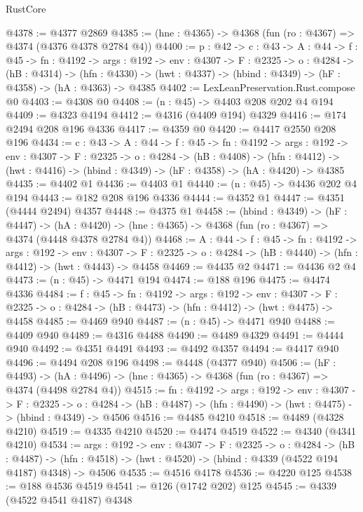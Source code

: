 \begin{lexlean}{RustCore}
\begin{coremodule}
@4378 := @4377 @2869
@4385 := (hne : @4365) -> @4368 (fun (ro : @4367) => @4374 (@4376 @4378 @2784 @4))
@4400 := {p : @42} ->
  {c : @43} ->
  {A : @44} ->
  {f : @45} ->
  {fn : @4192} ->
  {args : @192} ->
  {env : @4307} ->
  {F : @2325} ->
  {o : @4284} ->
  (hB : @4314) ->
  (hfn : @4330) -> (hwt : @4337) -> (hbind : @4349) -> (hF : @4358) -> (hA : @4363) -> @4385
@4402 := LexLeanPreservation.Rust.compose @0
@4403 := @4308 @0
@4408 := (n : @45) -> @4403 @208 @202 @4 @194
@4409 := @4323 @4194
@4412 := @4316 (@4409 @194) @4329
@4416 := @174 @2494 @208 @196 @4336
@4417 := @4359 @0
@4420 := @4417 @2550 @208 @196
@4434 := {c : @43} ->
  {A : @44} ->
  {f : @45} ->
  {fn : @4192} ->
  {args : @192} ->
  {env : @4307} ->
  {F : @2325} ->
  {o : @4284} ->
  (hB : @4408) ->
  (hfn : @4412) -> (hwt : @4416) -> (hbind : @4349) -> (hF : @4358) -> (hA : @4420) -> @4385
@4435 := @4402 @1
@4436 := @4403 @1
@4440 := (n : @45) -> @4436 @202 @4 @194
@4443 := @182 @208 @196 @4336
@4444 := @4352 @1
@4447 := @4351 (@4444 @2494) @4357
@4448 := @4375 @1
@4458 := (hbind : @4349) ->
  (hF : @4447) ->
  (hA : @4420) -> (hne : @4365) -> @4368 (fun (ro : @4367) => @4374 (@4448 @4378 @2784 @4))
@4468 := {A : @44} ->
  {f : @45} ->
  {fn : @4192} ->
  {args : @192} ->
  {env : @4307} ->
  {F : @2325} -> {o : @4284} -> (hB : @4440) -> (hfn : @4412) -> (hwt : @4443) -> @4458
@4469 := @4435 @2
@4471 := @4436 @2 @4
@4473 := (n : @45) -> @4471 @194
@4474 := @188 @196
@4475 := @4474 @4336
@4484 := {f : @45} ->
  {fn : @4192} ->
  {args : @192} ->
  {env : @4307} ->
  {F : @2325} -> {o : @4284} -> (hB : @4473) -> (hfn : @4412) -> (hwt : @4475) -> @4458
@4485 := @4469 @940
@4487 := (n : @45) -> @4471 @940
@4488 := @4409 @940
@4489 := @4316 @4488
@4490 := @4489 @4329
@4491 := @4444 @940
@4492 := @4351 @4491
@4493 := @4492 @4357
@4494 := @4417 @940
@4496 := @4494 @208 @196
@4498 := @4448 (@4377 @940)
@4506 := (hF : @4493) ->
  (hA : @4496) -> (hne : @4365) -> @4368 (fun (ro : @4367) => @4374 (@4498 @2784 @4))
@4515 := {fn : @4192} ->
  {args : @192} ->
  {env : @4307} ->
  {F : @2325} ->
  {o : @4284} -> (hB : @4487) -> (hfn : @4490) -> (hwt : @4475) -> (hbind : @4349) -> @4506
@4516 := @4485 @4210
@4518 := @4489 (@4328 @4210)
@4519 := @4335 @4210
@4520 := @4474 @4519
@4522 := @4340 (@4341 @4210)
@4534 := {args : @192} ->
  {env : @4307} ->
  {F : @2325} ->
  {o : @4284} ->
  (hB : @4487) ->
  (hfn : @4518) -> (hwt : @4520) -> (hbind : @4339 (@4522 @194 @4187) @4348) -> @4506
@4535 := @4516 @4178
@4536 := @4220 @125
@4538 := @188 @4536 @4519
@4541 := @126 (@1742 @202) @125
@4545 := @4339 (@4522 @4541 @4187) @4348

\end{coremodule}
\end{lexlean}

